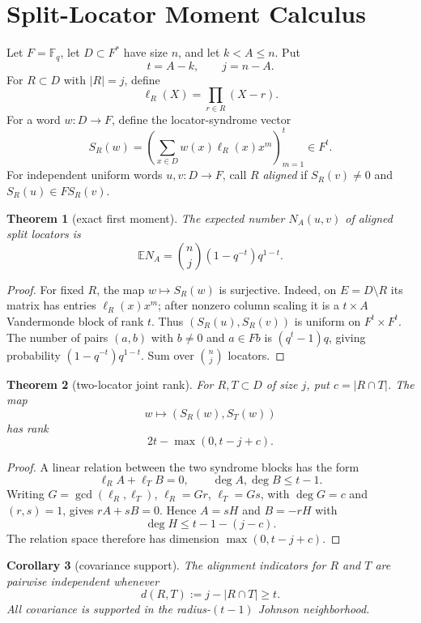 \documentclass[11pt]{article}
\newtheorem{theorem}{Theorem}[section]
\newtheorem{corollary}[theorem]{Corollary}
\theoremstyle{definition}
\theoremstyle{remark}
\newcommand{\F}{\mathbb F}
\newcommand{\E}{\mathbb E}
\begin{document}
\section{Split-Locator Moment Calculus}

Let $F=\F_q$, let $D\subset F^*$ have size $n$, and let $k<A\le n$.  Put
\[
        t=A-k,\qquad j=n-A.
\]
For $R\subset D$ with $|R|=j$, define
\[
        \ell_R(X)=\prod_{r\in R}(X-r).
\]
For a word $w:D\to F$, define the locator-syndrome vector
\[
        S_R(w)=
        \left(\sum_{x\in D} w(x)\ell_R(x)x^m\right)_{m=1}^{t}
        \in F^t.
\]
For independent uniform words $u,v:D\to F$, call $R$ \emph{aligned} if
$S_R(v)\ne0$ and $S_R(u)\in F S_R(v)$.

\begin{theorem}[exact first moment]\label{thm:first-moment}
The expected number $N_A(u,v)$ of aligned split locators is
\[
        \E N_A
        =
        \binom{n}{j}(1-q^{-t})q^{1-t}.
\]
\end{theorem}

\begin{proof}
For fixed $R$, the map $w\mapsto S_R(w)$ is surjective.  Indeed, on
$E=D\setminus R$ its matrix has entries $\ell_R(x)x^m$; after nonzero column
scaling it is a $t\times A$ Vandermonde block of rank $t$.  Thus
$(S_R(u),S_R(v))$ is uniform on $F^t\times F^t$.  The number of pairs
$(a,b)$ with $b\ne0$ and $a\in F b$ is $(q^t-1)q$, giving probability
$(1-q^{-t})q^{1-t}$.  Sum over $\binom nj$ locators.
\end{proof}

\begin{theorem}[two-locator joint rank]\label{thm:joint-rank}
For $R,T\subset D$ of size $j$, put $c=|R\cap T|$.  The map
\[
        w\mapsto (S_R(w),S_T(w))
\]
has rank
\[
        2t-\max(0,t-j+c).
\]
\end{theorem}

\begin{proof}
A linear relation between the two syndrome blocks has the form
\[
        \ell_R A+\ell_T B=0,\qquad \deg A,\deg B\le t-1.
\]
Writing $G=\gcd(\ell_R,\ell_T)$, $\ell_R=Gr$, $\ell_T=Gs$, with
$\deg G=c$ and $(r,s)=1$, gives $rA+sB=0$.  Hence $A=sH$ and $B=-rH$ with
\[
        \deg H\le t-1-(j-c).
\]
The relation space therefore has dimension $\max(0,t-j+c)$.
\end{proof}

\begin{corollary}[covariance support]\label{cor:covariance}
The alignment indicators for $R$ and $T$ are pairwise independent whenever
\[
        d(R,T):=j-|R\cap T|\ge t.
\]
All covariance is supported in the radius-$(t-1)$ Johnson neighborhood.
\end{corollary}
\end{document}
